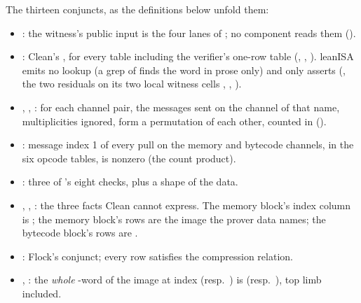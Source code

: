 The thirteen conjuncts, as the definitions below unfold them:
\begin{sloppypar}
\begin{itemize}
\item {}: the witness's public input is the four lanes of ; no
  component reads them ().
\item {}: Clean's , for every table including the verifier's
  one-row table 
  (, ,
  ). leanISA emits no lookup (a grep of
   finds the word in prose only) and only 
  asserts (, the two residuals on its two local witness cells
  , , ).
\item {}, , : for each channel
  pair, the messages sent on the channel of that name, multiplicities ignored, form a
  permutation of each other, counted in  ().
\item {}: message index 1 of every pull on the memory and bytecode channels,
  in the six opcode tables, is nonzero (the count product).
\item {}: three of 's eight checks, plus a shape of the data.
\item {}, , : the three facts Clean cannot
  express. The memory block's index column is ; the memory block's rows are the
  image the prover data names; the bytecode block's rows are .
\item {}: Flock's conjunct; every  row satisfies the compression
  relation.
\item {}, : the \emph{whole} -word of the image at index
   (resp.\ ) is  (resp.\ ), top limb
  included.
\end{itemize}
\end{sloppypar}

